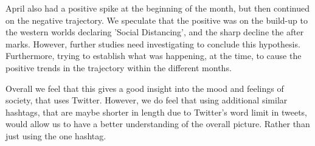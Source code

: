 \documentclass[a4paper,10pt]{article}
\begin{document}
	April also had a positive spike at the beginning of the month, but then continued on the negative trajectory. We speculate that the positive was on the build-up to the western worlds declaring 'Social Distancing', and the sharp decline the after marks. However, further studies need investigating to conclude this hypothesis. Furthermore, trying to establish what was happening, at the time, to cause the positive trends in the trajectory within the different months.
	
	Overall we feel that this gives a good insight into the mood and feelings of society, that uses Twitter. However, we do feel that using additional similar hashtags, that are maybe shorter in length due to Twitter's word limit in tweets, would allow us to have a better understanding of the overall picture. Rather than just using the one hashtag.
	
	
	\newpage

	
	
	{\footnotesize
		
	}
	
	
\end{document}
